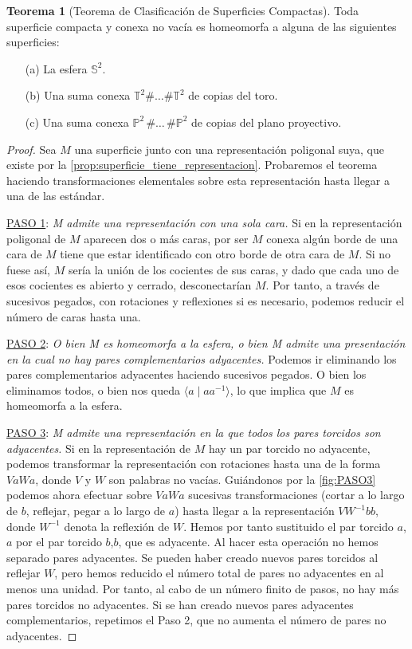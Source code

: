 \documentclass[10pt]{report}
\newcommand{\Esfera}{\mathbb{S}^2}
\newcommand{\Toro}{\mathbb{T}^2}
\newcommand{\Proyectivo}{\mathbb{P}^2}
\theoremstyle{definition}
\newtheorem{tma}[defin]{Teorema}
\begin{document}
\begin{tma}[Teorema de Clasificación de Superficies Compactas]\label{teo:csc}
Toda superficie compacta y conexa no vacía es homeomorfa a alguna de las siguientes superficies:
\begin{itemize}
\item[(a)] La esfera $\Esfera$.
\item[(b)] Una suma conexa $\Toro \# \dots \# \Toro$ de copias del toro.
\item[(c)] Una suma conexa $\Proyectivo \,  \# \dots\, \# \Proyectivo$ de copias del plano proyectivo. 
\end{itemize}
\end{tma}
\begin{proof}
Sea $M$ una superficie junto con una representación poligonal suya, que existe por la \autoref{prop:superficie_tiene_representacion}. Probaremos el teorema haciendo transformaciones elementales sobre esta representación hasta llegar a una de las estándar.

\underline{PASO 1}: \textit{M admite una representación con una sola cara.} Si en la representación poligonal de $M$ aparecen dos o más caras, por ser $M$ conexa algún borde de una cara de $M$ tiene que estar identificado con otro borde de otra cara de $M$. Si no fuese así, $M$ sería la unión de los cocientes de sus caras, y dado que cada uno de esos cocientes es abierto y cerrado, desconectarían $M$. Por tanto, a través de sucesivos pegados, con rotaciones y reflexiones si es necesario, podemos reducir el número de caras hasta una.

\underline{PASO 2}: \textit{O bien M es homeomorfa a la esfera, o bien M admite una presentación en la cual no hay pares complementarios adyacentes.} Podemos ir eliminando los pares complementarios adyacentes haciendo sucesivos pegados. O bien los eliminamos todos, o bien nos queda $\langle a\mid aa^{-1}\rangle$, lo que implica que $M$ es homeomorfa a la esfera.

\underline{PASO 3}: \textit{M admite una representación en la que todos los pares torcidos son adyacentes.} Si en la representación de $M$ hay un par torcido no adyacente, podemos transformar la representación con rotaciones hasta una de la forma $VaWa$, donde $V$ y $W$ son palabras no vacías. Guiándonos por la \autoref{fig:PASO3} podemos ahora efectuar sobre $VaWa$ sucesivas transformaciones (cortar a lo largo de $b$, reflejar, pegar a lo largo de $a$) hasta llegar a la representación $VW^{-1}bb$, donde $W^{-1}$ denota la reflexión de $W$. Hemos por tanto sustituido el par torcido $a$,$a$ por el par torcido $b$,$b$, que es adyacente. Al hacer esta operación no hemos separado pares adyacentes. Se pueden haber creado nuevos pares torcidos al reflejar $W$, pero hemos reducido el número total de pares no adyacentes en al menos una unidad. Por tanto, al cabo de un número finito de pasos, no hay más pares torcidos no adyacentes. Si se han creado nuevos pares adyacentes complementarios, repetimos el Paso 2, que no aumenta el número de pares no adyacentes.


\end{proof}
\end{document}
